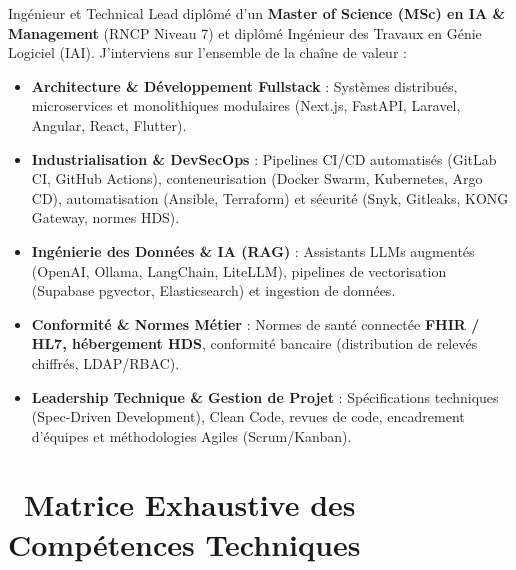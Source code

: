\documentclass[10pt,a4paper]{article}
\begin{document}
\vspace{0.2em}

Ingénieur et Technical Lead diplômé d'un \textbf{Master of Science (MSc) en IA \& Management} (RNCP Niveau 7) et diplômé Ingénieur des Travaux en Génie Logiciel (IAI). J'interviens sur l'ensemble de la chaîne de valeur :
\begin{itemize}[leftmargin=1.4em, itemsep=0.15em, topsep=0.15em]
    \item \textbf{Architecture \& Développement Fullstack} : Systèmes distribués, microservices et monolithiques modulaires (Next.js, FastAPI, Laravel, Angular, React, Flutter).
    \item \textbf{Industrialisation \& DevSecOps} : Pipelines CI/CD automatisés (GitLab CI, GitHub Actions), conteneurisation (Docker Swarm, Kubernetes, Argo CD), automatisation (Ansible, Terraform) et sécurité (Snyk, Gitleaks, KONG Gateway, normes HDS).
    \item \textbf{Ingénierie des Données \& IA (RAG)} : Assistants LLMs augmentés (OpenAI, Ollama, LangChain, LiteLLM), pipelines de vectorisation (Supabase pgvector, Elasticsearch) et ingestion de données.
    \item \textbf{Conformité \& Normes Métier} : Normes de santé connectée \textbf{FHIR / HL7, hébergement HDS}, conformité bancaire (distribution de relevés chiffrés, LDAP/RBAC).
    \item \textbf{Leadership Technique \& Gestion de Projet} : Spécifications techniques (Spec-Driven Development), Clean Code, revues de code, encadrement d'équipes et méthodologies Agiles (Scrum/Kanban).
\end{itemize}

\section{\faTable\ Matrice Exhaustive des Compétences Techniques}
\end{document}
